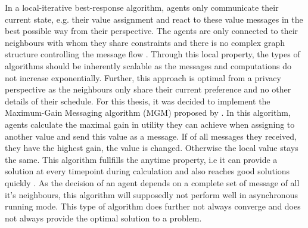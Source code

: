 In a local-iterative best-response algorithm, agents only communicate their current state, e.g. their value assignment and react to these value messages in the best possible way from their perspective. The agents are only connected to their neighbours with whom they share constraints and there is no complex graph structure controlling the message flow \cite{Chapman2011}. Through this local property, the types of algorithms should be inherently scalable as the messages and computations do not increase exponentially. Further, this approach is optimal from a privacy perspective as the neighbours only share their current preference and no other details of their schedule. %
\newline\newline
For this thesis, it was decided to implement the Maximum-Gain Messaging algorithm (MGM) proposed by \cite{Yokoo1996}. In this algorithm, agents  calculate the maximal gain in utility they can achieve when assigning to another value and send this value as a message. If of all messages they received, they have the highest gain, the value is changed. Otherwise the local value stays the same. This algorithm fullfills the anytime property, i.e it can provide a solution at every timepoint during calculation and also reaches good solutions quickly \cite{Chapman2010}. As the decision of an agent depends on a complete set of message of all it's neighbours, this algorithm will supposedly not perform well in asynchronous running mode. This type of algorithm does further not always converge and does not always provide the optimal solution to a problem.

